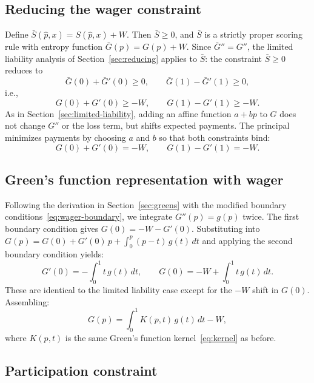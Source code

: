 \documentclass[11pt]{article}
\begin{document}
\subsection{Reducing the wager constraint}

Define $\bar{S}(\hat{p}, x) = S(\hat{p}, x) + W$. Then $\bar{S} \geq 0$, and $\bar{S}$ is a strictly proper scoring rule with entropy function $\bar{G}(p) = G(p) + W$. Since $\bar{G}'' = G''$, the limited liability analysis of Section~\ref{sec:reducing} applies to $\bar{S}$: the constraint $\bar{S} \geq 0$ reduces to
\[
\bar{G}(0) + \bar{G}'(0) \geq 0, \qquad \bar{G}(1) - \bar{G}'(1) \geq 0,
\]
i.e.,
\begin{equation}\label{eq:wager-reduced}
G(0) + G'(0) \geq -W, \qquad G(1) - G'(1) \geq -W.
\end{equation}
As in Section~\ref{sec:limited-liability}, adding an affine function $a + bp$ to $G$ does not change $G''$ or the loss term, but shifts expected payments. The principal minimizes payments by choosing $a$ and $b$ so that both constraints bind:
\begin{equation}\label{eq:wager-boundary}
G(0) + G'(0) = -W, \qquad G(1) - G'(1) = -W.
\end{equation}

\subsection{Green's function representation with wager}

Following the derivation in Section~\ref{sec:greens} with the modified boundary conditions~\eqref{eq:wager-boundary}, we integrate $G''(p) = g(p)$ twice. The first boundary condition gives $G(0) = -W - G'(0)$. Substituting into $G(p) = G(0) + G'(0)\,p + \int_0^p (p-t)\,g(t)\,dt$ and applying the second boundary condition yields:
\[
G'(0) = -\int_0^1 t\,g(t)\,dt, \qquad G(0) = -W + \int_0^1 t\,g(t)\,dt.
\]
These are identical to the limited liability case except for the $-W$ shift in $G(0)$. Assembling:
\begin{equation}\label{eq:G-wager}
G(p) = \int_0^1 K(p,t)\,g(t)\,dt - W,
\end{equation}
where $K(p,t)$ is the same Green's function kernel~\eqref{eq:kernel} as before.

\subsection{Participation constraint}
\end{document}
